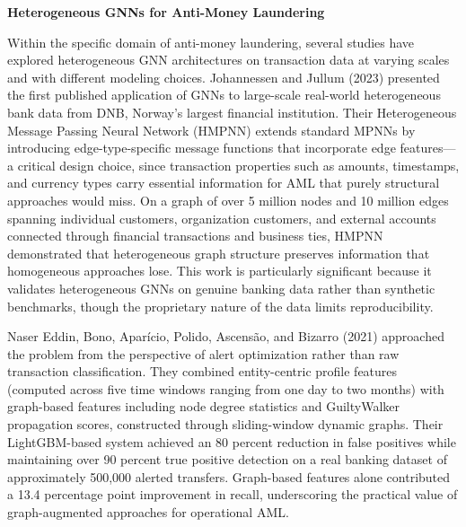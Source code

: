 \documentclass[12pt,a4paper]{article}
\begin{document}
\bigskip
\noindent\textbf{Heterogeneous GNNs for Anti-Money Laundering}

\noindent Within the specific domain of anti-money laundering, several studies have explored heterogeneous GNN architectures on transaction data at varying scales and with different modeling choices. Johannessen and Jullum (2023) presented the first published application of GNNs to large-scale real-world heterogeneous bank data from DNB, Norway's largest financial institution. Their Heterogeneous Message Passing Neural Network (HMPNN) extends standard MPNNs by introducing edge-type-specific message functions that incorporate edge features---a critical design choice, since transaction properties such as amounts, timestamps, and currency types carry essential information for AML that purely structural approaches would miss. On a graph of over 5 million nodes and 10 million edges spanning individual customers, organization customers, and external accounts connected through financial transactions and business ties, HMPNN demonstrated that heterogeneous graph structure preserves information that homogeneous approaches lose. This work is particularly significant because it validates heterogeneous GNNs on genuine banking data rather than synthetic benchmarks, though the proprietary nature of the data limits reproducibility.

Naser Eddin, Bono, Aparício, Polido, Ascensão, and Bizarro (2021) approached the problem from the perspective of alert optimization rather than raw transaction classification. They combined entity-centric profile features (computed across five time windows ranging from one day to two months) with graph-based features including node degree statistics and GuiltyWalker propagation scores, constructed through sliding-window dynamic graphs. Their LightGBM-based system achieved an 80 percent reduction in false positives while maintaining over 90 percent true positive detection on a real banking dataset of approximately 500,000 alerted transfers. Graph-based features alone contributed a 13.4 percentage point improvement in recall, underscoring the practical value of graph-augmented approaches for operational AML.
\end{document}
